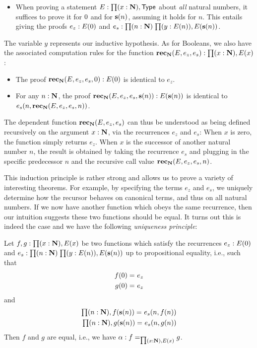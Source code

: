 \begin{itemize}
\item When proving a statement $E : \prd{x : \nat} \type$ about \emph{all} natural numbers, it suffices to prove it for $0$ and for $\mathbf{s}(n)$, assuming it holds
for $n$. This entails giving the proofs $e_z : E(0)$ and $e_s : \prd{n : \nat}{y : E(n)} E(\s(n))$.
\end{itemize}
The variable $y$ represents our inductive hypothesis. As for Booleans, we also have the associated computation rules for the function $\rec_\nat(E,e_z,e_s) : \prd{x:\nat} E(x)$:
\begin{itemize}
\item The proof $\mathbf{rec}_\mathbf{N}(E,e_z,e_s,0) : E(0)$ is identical to $e_z$.
\item For any $n : \mathbf{N}$, the proof $\mathbf{rec}_\mathbf{N}(E,e_z,e_s,\mathbf{s}(n)) : E(\mathbf{s}(n))$ is identical to $e_s(n,\mathbf{rec}_\mathbf{N}(E,e_z,e_s,n))$.
\end{itemize}
The dependent function $\mathbf{rec}_\mathbf{N}(E,e_z,e_s)$ can thus be understood as being defined recursively on the argument $x : \mathbf{N}$, via the recurrences $e_z$ and $e_s$: When $x$ is zero, the function simply returns $e_z$. When $x$ is the successor of another natural number $n$, the result is obtained by taking the recurrence $e_s$ and plugging in the specific predecessor $n$ and the recursive call value $\mathbf{rec}_\mathbf{N}(E,e_z,e_s,n)$.

This induction principle is rather strong and allows us to prove a variety of interesting theorems. For example, by specifying the terms $e_z$ and $e_s$, we  uniquely determine how the recursor behaves on canonical terms, and thus on all natural numbers. If we now have another function which obeys the same recurrence, then our intuition suggests these two functions should be equal. It turns out this is indeed the case and we have the following \emph{uniqueness principle}:

\begin{thm}
Let $f,g : \prd{x:\nat} E(x)$ be two functions which satisfy the recurrences $e_z : E(0)$ and $e_s : \prd{n : \nat}{y : E(n)} E(\s(n))$ up to propositional equality, i.e., such that
\begin{align*}
f(0) =_{} e_z \\ 
g(0) =_{} e_z
\end{align*}
and 
\begin{align*}
\prd{n : \nat} \id{f(\s(n))}{e_s(n, f(n))} \\
\prd{n : \nat} \id{g(\s(n))}{e_s(n, g(n))}
\end{align*}
Then $f$ and $g$ are equal, i.e., we have $\alpha : \id[\prd{x :\nat} E(x)]{f}{g}$. 
\end{thm}

